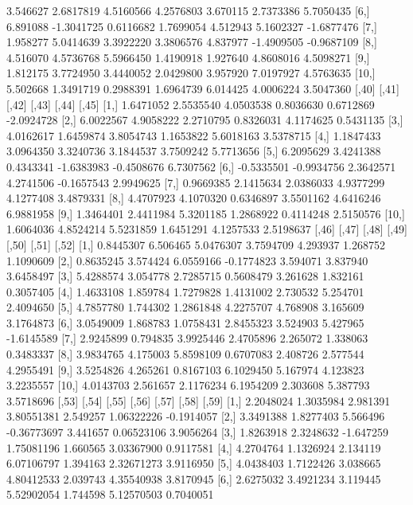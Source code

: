 \documentclass[12pt]{article}
\begin{document}
\begin{Schunk}
\begin{Soutput}
 [5,] 3.546627  2.6817819 4.5160566 4.2576803 3.670115  2.7373386  5.7050435
 [6,] 6.891088 -1.3041725 0.6116682 1.7699054 4.512943  5.1602327 -1.6877476
 [7,] 1.958277  5.0414639 3.3922220 3.3806576 4.837977 -1.4909505 -0.9687109
 [8,] 4.516070  4.5736768 5.5966450 1.4190918 1.927640  4.8608016  4.5098271
 [9,] 1.812175  3.7724950 3.4440052 2.0429800 3.957920  7.0197927  4.5763635
[10,] 5.502668  1.3491719 0.2988391 1.6964739 6.014425  4.0006224  3.5047360
           [,40]      [,41]     [,42]      [,43]      [,44]      [,45]
 [1,]  1.6471052  2.5535540 4.0503538  0.8036630  0.6712869 -2.0924728
 [2,]  6.0022567  4.9058222 2.2710795  0.8326031  4.1174625  0.5431135
 [3,]  4.0162617  1.6459874 3.8054743  1.1653822  5.6018163  3.5378715
 [4,]  1.1847433  3.0964350 3.3240736  3.1844537  3.7509242  5.7713656
 [5,]  6.2095629  3.4241388 0.4343341 -1.6383983 -0.4508676  6.7307562
 [6,] -0.5335501 -0.9934756 2.3642571  4.2741506 -0.1657543  2.9949625
 [7,]  0.9669385  2.1415634 2.0386033  4.9377299  4.1277408  3.4879331
 [8,]  4.4707923  4.1070320 0.6346897  3.5501162  4.6416246  6.9881958
 [9,]  1.3464401  2.4411984 5.3201185  1.2868922  0.4114248  2.5150576
[10,]  1.6064036  4.8524214 5.5231859  1.6451291  4.1257533  2.5198637
          [,46]    [,47]     [,48]      [,49]    [,50]    [,51]      [,52]
 [1,] 0.8445307 6.506465 5.0476307  3.7594709 4.293937 1.268752  1.1090609
 [2,] 0.8635245 3.574424 6.0559166 -0.1774823 3.594071 3.837940  3.6458497
 [3,] 5.4288574 3.054778 2.7285715  0.5608479 3.261628 1.832161  0.3057405
 [4,] 1.4633108 1.859784 1.7279828  1.4131002 2.730532 5.254701  2.4094650
 [5,] 4.7857780 1.744302 1.2861848  4.2275707 4.768908 3.165609  3.1764873
 [6,] 3.0549009 1.868783 1.0758431  2.8455323 3.524903 5.427965 -1.6145589
 [7,] 2.9245899 0.794835 3.9925446  2.4705896 2.265072 1.338063  0.3483337
 [8,] 3.9834765 4.175003 5.8598109  0.6707083 2.408726 2.577544  4.2955491
 [9,] 3.5254826 4.265261 0.8167103  6.1029450 5.167974 4.123823  3.2235557
[10,] 4.0143703 2.561657 2.1176234  6.1954209 2.303608 5.387793  3.5718696
          [,53]     [,54]     [,55]       [,56]     [,57]      [,58]      [,59]
 [1,] 2.2048024 1.3035984  2.981391  3.80551381  2.549257 1.06322226 -0.1914057
 [2,] 3.3491388 1.8277403  5.566496 -0.36773697  3.441657 0.06523106  3.9056264
 [3,] 1.8263918 2.3248632 -1.647259  1.75081196  1.660565 3.03367900  0.9117581
 [4,] 4.2704764 1.1326924  2.134119  6.07106797  1.394163 2.32671273  3.9116950
 [5,] 4.0438403 1.7122426  3.038665  4.80412533  2.039743 4.35540938  3.8170945
 [6,] 2.6275032 3.4921234  3.119445  5.52902054  1.744598 5.12570503  0.7040051

\end{Soutput}
\end{Schunk}
\end{document}
